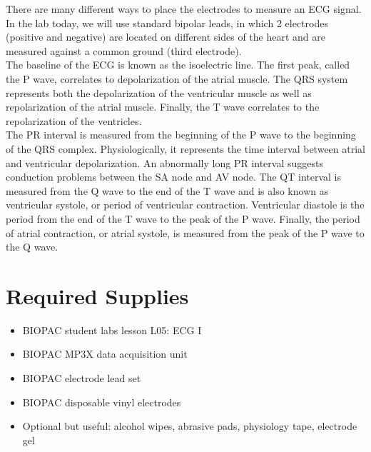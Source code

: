 \documentclass{article}
\begin{document}
There are many different ways to place the electrodes to measure an ECG signal. In the lab today, we will use standard bipolar leads, in which 2 electrodes (positive and negative) are located on different sides of the heart and are measured against a common ground (third electrode).\\

The baseline of the ECG is known as the isoelectric line. The first peak, called the P wave, correlates to depolarization of the atrial muscle. The QRS system represents both the depolarization of the ventricular muscle as well as repolarization of the atrial muscle. Finally, the T wave correlates to the repolarization of the ventricles.\\

The PR interval is measured from the beginning of the P wave to the beginning of the QRS complex. Physiologically, it represents the time interval between atrial and ventricular depolarization. An abnormally long PR interval suggests conduction problems between the SA node and AV node. The QT interval is measured from the Q wave to the end of the T wave and is also known as ventricular systole, or period of ventricular contraction. Ventricular diastole is the period from the end of the T wave to the peak of the P wave. Finally, the period of atrial contraction, or atrial systole, is measured from the peak of the P wave to the Q wave.

\section*{Required Supplies}
\begin{itemize}
	\item BIOPAC student labs lesson L05: ECG I
	\item BIOPAC MP3X data acquisition unit
	\item BIOPAC electrode lead set
	\item BIOPAC disposable vinyl electrodes
	\item Optional but useful: alcohol wipes, abrasive pads, physiology tape, electrode gel
\end{itemize}
\end{document}

